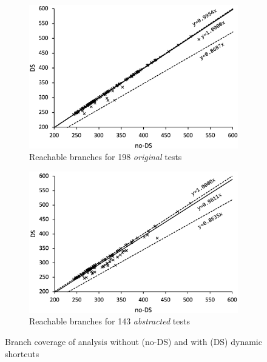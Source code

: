 \begin{figure}[t]
  \centering
  \begin{subfigure}[t]{0.48\textwidth}
    \includegraphics[width=\linewidth]{img/conc-precision}
    \vspace*{-1.5em}
    \caption{Reachable branches for 198 \textit{original} tests}
    \label{fig:precision-fail}
  \end{subfigure}
  \begin{subfigure}[t]{0.48\textwidth}
    \includegraphics[width=\linewidth]{img/abs-precision}
    \vspace*{-1.5em}
    \caption{Reachable branches for 143 \textit{abstracted} tests}
    \label{fig:precision-branch}
  \end{subfigure}
  \vspace*{-1em}
  \caption{Branch coverage of analysis without (no-DS) and with (DS) dynamic shortcuts}
  \label{fig:precision}
  \vspace*{-1.5em}
\end{figure}



